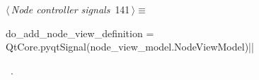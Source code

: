\documentclass[%
    a4paper,    %
    justified,  %
    nobib,      %
    openany     %
]{tufte-book}
\begin{document}
% 
% 
% 
\begin{flushleft} \small
\begin{minipage}{\linewidth}\label{scrap152}\raggedright\small
{} $\langle\,${\itshape Node controller signals}\nobreak\ {\footnotesize {141}}$\,\rangle\equiv$
\vspace{-1ex}
\begin{pythoncode}
do_add_node_view_definition = QtCore.pyqtSignal(node_view_model.NodeViewModel)|\NWsep|
\end{pythoncode}
\vspace{1.5ex}
\footnotesize
\begin{list}{}{\setlength{\itemsep}{-\parsep}\setlength{\itemindent}{-\leftmargin}}
\item \NWtxtMacroRefIn\ .

\item{}
\end{list}
\end{minipage}\vspace{4ex}
\end{flushleft}
\end{document}

